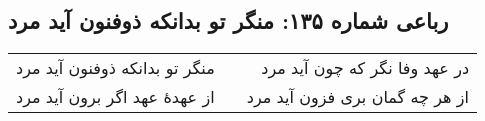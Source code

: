 \begin{center}
\section*{رباعی شماره ۱۳۵: منگر تو بدانکه ذوفنون آید مرد}
\label{sec:sh135}
\begin{longtable}{l p{0.5cm} r}
منگر تو بدانکه ذوفنون آید مرد
&&
در عهد وفا نگر که چون آید مرد
\\
از عهدهٔ عهد اگر برون آید مرد
&&
از هر چه گمان بری فزون آید مرد
\\
\end{longtable}
\end{center}
